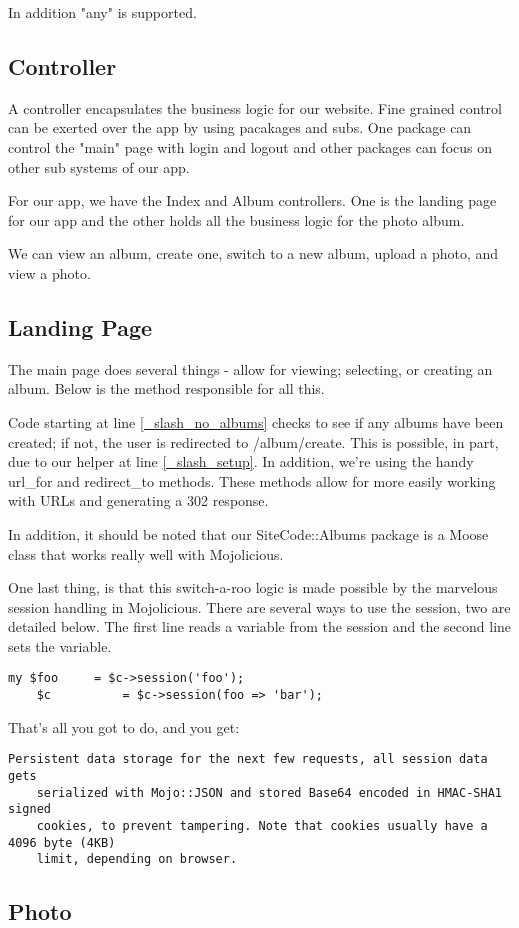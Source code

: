 \documentclass[17pt]{extreport}
\newcommand\Small{\fontsize{10}{10.2}\selectfont}
\newcommand*\LSTfont{\Small\ttfamily\SetTracking{encoding=*}{-60}\lsstyle}
\begin{document}
In addition "any" is supported.

\subsection{Controller}

A controller encapsulates the business logic for our website.  Fine grained
control can be exerted over the app by using pacakages and subs.  One package
can control the "main" page with login and logout and other packages can focus
on other sub systems of our app.

For our app, we have the Index and Album controllers.  One is the landing page for
our app and the other holds all the business logic for the photo album.

We can view an album, create one, switch to a new album, upload a photo, and
view a photo.

\subsection{Landing Page}

The main page does several things - allow for viewing; selecting, or creating
an album.  Below is the method responsible for all this.



Code starting at line \ref{_slash_no_albums} checks to see if any albums have
been created; if not, the user is redirected to /album/create.  This is
possible, in part, due to our helper at line \ref{_slash_setup}.  In addition,
we're using the handy url\_for and redirect\_to methods. These methods allow
for more easily working with URLs and generating a 302 response.

In addition, it should be noted that our SiteCode::Albums package is a Moose
class that works really well with Mojolicious.

One last thing, is that this switch-a-roo logic is made possible by the
marvelous session handling in Mojolicious.  There are several ways to use the
session, two are detailed below.  The first line reads a variable from the
session and the second line sets the variable.

\begin{lstlisting}[style=BlockStyle]
    my $foo     = $c->session('foo');
    $c          = $c->session(foo => 'bar');
\end{lstlisting}

That's all you got to do, and you get:

\begin{lstlisting}[style=BlockStyle]
    Persistent data storage for the next few requests, all session data gets
    serialized with Mojo::JSON and stored Base64 encoded in HMAC-SHA1 signed
    cookies, to prevent tampering. Note that cookies usually have a 4096 byte (4KB)
    limit, depending on browser.
\end{lstlisting}

\subsection{Photo}
\end{document}
